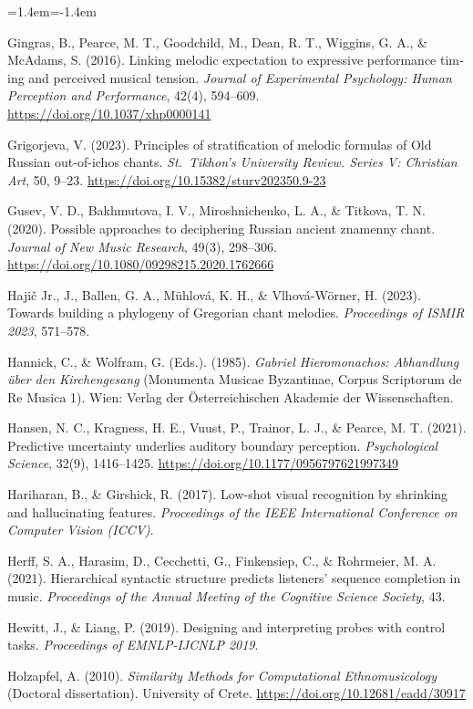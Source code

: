 \documentclass[11pt,a4paper]{article}
\newenvironment{reflist}{\begin{list}{}{\leftmargin=1.4em\itemindent=-1.4em\itemsep=0.8pt\parsep=0pt}\small}{\end{list}}
\begin{document}
\begin{otherlanguage}{english}
\begin{reflist}
\item Gingras, B., Pearce, M. T., Goodchild, M., Dean, R. T., Wiggins, G. A., \& McAdams, S. (2016). Linking melodic expectation to expressive performance timing and perceived musical tension. \emph{Journal of Experimental Psychology: Human Perception and Performance}, 42(4), 594--609. \url{https://doi.org/10.1037/xhp0000141}
\item Grigorjeva, V. (2023). Principles of stratification of melodic formulas of Old Russian out-of-ichos chants. \emph{St.~Tikhon's University Review. Series V: Christian Art}, 50, 9--23. \url{https://doi.org/10.15382/sturv202350.9-23}
\item Gusev, V. D., Bakhmutova, I. V., Miroshnichenko, L. A., \& Titkova, T. N. (2020). Possible approaches to deciphering Russian ancient znamenny chant. \emph{Journal of New Music Research}, 49(3), 298--306. \url{https://doi.org/10.1080/09298215.2020.1762666}
\item Hajič Jr., J., Ballen, G. A., Mühlová, K. H., \& Vlhová-Wörner, H. (2023). Towards building a phylogeny of Gregorian chant melodies. \emph{Proceedings of ISMIR 2023}, 571--578.
\item Hannick, C., \& Wolfram, G. (Eds.). (1985). \emph{Gabriel Hieromonachos: Abhandlung über den Kirchengesang} (Monumenta Musicae Byzantinae, Corpus Scriptorum de Re Musica 1). Wien: Verlag der Österreichischen Akademie der Wissenschaften.
\item Hansen, N. C., Kragness, H. E., Vuust, P., Trainor, L. J., \& Pearce, M. T. (2021). Predictive uncertainty underlies auditory boundary perception. \emph{Psychological Science}, 32(9), 1416--1425. \url{https://doi.org/10.1177/0956797621997349}
\item Hariharan, B., \& Girshick, R. (2017). Low-shot visual recognition by shrinking and hallucinating features. \emph{Proceedings of the IEEE International Conference on Computer Vision (ICCV)}.
\item Herff, S. A., Harasim, D., Cecchetti, G., Finkensiep, C., \& Rohrmeier, M. A. (2021). Hierarchical syntactic structure predicts listeners' sequence completion in music. \emph{Proceedings of the Annual Meeting of the Cognitive Science Society}, 43.
\item Hewitt, J., \& Liang, P. (2019). Designing and interpreting probes with control tasks. \emph{Proceedings of EMNLP-IJCNLP 2019}.
\item Holzapfel, A. (2010). \emph{Similarity Methods for Computational Ethnomusicology} (Doctoral dissertation). University of Crete. \url{https://doi.org/10.12681/eadd/30917}

\end{reflist}
\end{otherlanguage}
\end{document}
